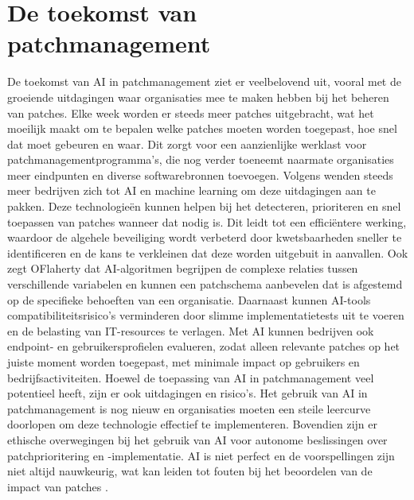 \section{De toekomst van patchmanagement}
De toekomst van AI in patchmanagement ziet er veelbelovend uit, vooral met de groeiende uitdagingen waar organisaties mee te maken hebben bij
het beheren van patches. Elke week worden er steeds meer patches uitgebracht, wat het moeilijk maakt om te bepalen welke patches moeten worden toegepast, hoe snel dat moet gebeuren en waar. Dit zorgt voor een aanzienlijke werklast voor patchmanagementprogramma's, die nog verder toeneemt naarmate
organisaties meer eindpunten en diverse softwarebronnen toevoegen. Volgens \textcite{OFlaherty2023} wenden steeds meer bedrijven zich tot AI en machine learning
om deze uitdagingen aan te pakken. Deze technologieën kunnen helpen bij het detecteren, prioriteren en snel toepassen van patches wanneer dat nodig is. Dit leidt tot een efficiëntere werking, waardoor de algehele beveiliging wordt verbeterd door kwetsbaarheden sneller te 
identificeren en de kans te verkleinen dat deze worden uitgebuit in aanvallen.
Ook zegt OFlaherty dat AI-algoritmen begrijpen de complexe relaties tussen verschillende variabelen en kunnen een patchschema aanbevelen dat is afgestemd op de specifieke behoeften van een organisatie. Daarnaast kunnen AI-tools compatibiliteitsrisico's 
verminderen door slimme implementatietests uit te voeren en de belasting van IT-resources te verlagen. Met AI kunnen bedrijven ook
 endpoint- en gebruikersprofielen evalueren, zodat alleen relevante patches op het juiste moment worden toegepast, met minimale impact op gebruikers en bedrijfsactiviteiten. Hoewel de toepassing van AI in patchmanagement veel potentieel heeft, zijn er 
 ook uitdagingen en risico's. Het gebruik van AI in patchmanagement is nog nieuw en organisaties moeten een steile leercurve doorlopen om deze technologie effectief te implementeren. Bovendien zijn er ethische 
overwegingen bij het gebruik van AI voor autonome beslissingen over patchprioritering en -implementatie. AI is niet perfect en de voorspellingen zijn niet altijd nauwkeurig, wat kan leiden tot fouten bij het beoordelen van de impact van patches​ \autocite{OFlaherty2023}.

